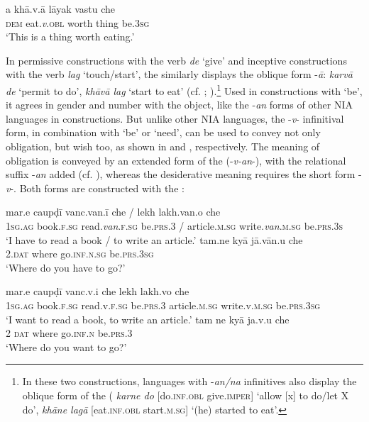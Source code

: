 \documentclass[output=paper]{langsci/langscibook}
\begin{document}
\ea\label{ex:montaut:33} 
\gll a khā.v.ā  lāyak   vastu  che\\
\textsc{dem}    eat.\textit{v}.\textsc{obl}    worth   thing   be.\textsc{3sg}  \\
\glt ‘This is a thing worth eating.’
\z 

In  permissive constructions with the verb \textit{de} ‘give’ and inceptive constructions with the verb \textit{lag} ‘touch/start’, the  similarly displays the oblique form -\textit{ā}: \textit{karvā de} ‘permit to do’, \textit{khāvā lag} ‘start to eat’ (cf. \citealt[688]{Cardona2003}; \citealt[52 ff.]{Dave1935}).\footnote{In these two constructions, languages with -\textit{an/na} infinitives also display the oblique form of the  ( \textit{karne do} [do.\textsc{inf.obl} give.\textsc{imper}] ‘allow [x] to do/let X do’, \textit{khāne lagā} [eat.\textsc{inf.obl} start.\textsc{m.sg}] ‘(he) started to eat’.} Used in  constructions with ‘be’, it agrees in gender and number with the object, like the -\textit{an}  forms of other NIA languages in  constructions. But unlike other NIA languages, the  -\textit{v}{}- infinitival form, in combination with  ‘be’ or ‘need’, can be used to convey not only obligation, but wish too, as shown in  and , respectively. The meaning of obligation is conveyed by an extended form of the  (-\textit{v-an}{}-), with the relational suffix -\textit{an} added (cf. \citealt[677]{Cardona2003}), whereas the desiderative meaning requires the short form -\textit{v}{}-. Both forms are constructed with the :

\ea\label{ex:montaut:34}
\ea\label{ex:montaut:34a} 
\gll mar.e caupḍī vanc.van.ī       che    /  lekh   lakh.van.o   che\\
\textsc{1sg.ag} book.\textsc{f.sg}  read.\textit{van}.\textsc{f.sg} be.\textsc{prs.3}  / article.\textsc{m.sg}  write.\textit{van}.\textsc{m.sg} be.\textsc{prs.3s}  \\
\glt ‘I have to read a book                        /     {to write an article.’}
\ex \label{ex:montaut:34b}
\gll tam.ne kyā  jā.vān.u  che\\
\textsc{2.dat}  where   go.\textsc{inf.n.sg}   be.\textsc{prs.3sg}  \\
\glt ‘Where do you have to go?’  \citep{Cardona2003}
\z 
\z 

\ea
\label{ex:montaut:35}
\ea \label{ex:montaut:35a}
\gll mar.e  caupḍī vanc.v.i che       lekh lakh.vo  che\\
\textsc{1sg.ag}  book.\textsc{f.sg}  read.v.\textsc{f.sg} be.\textsc{prs.3}  article.\textsc{m.sg}  write.v.\textsc{m.sg} be\textsc{.prs.3sg} \\
\glt ‘I want to read a book, to write an article.’
\ex \label{ex:montaut:35b}
\gll tam ne  kyā  ja.v.u   che\\
\textsc{2}   \textsc{dat}  where  go.\textsc{inf.n}   be\textsc{.prs}.\textsc{3}  \\
\glt ‘Where do you want to go?’ \citep{Cardona2003}
\z 
\z 
\end{document}
